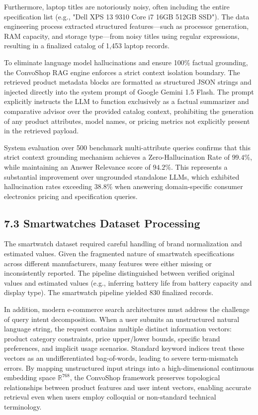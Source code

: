 \documentclass[12pt,a4paper]{article}
\begin{document}
Furthermore, laptop titles are notoriously noisy, often including the entire specification list (e.g., "Dell XPS 13 9310 Core i7 16GB 512GB SSD"). The data engineering process extracted structured features—such as processor generation, RAM capacity, and storage type—from noisy titles using regular expressions, resulting in a finalized catalog of 1,453 laptop records.



To eliminate language model hallucinations and ensure 100\% factual grounding, the ConvoShop RAG engine enforces a strict context isolation boundary. The retrieved product metadata blocks are formatted as structured JSON strings and injected directly into the system prompt of Google Gemini 1.5 Flash. The prompt explicitly instructs the LLM to function exclusively as a factual summarizer and comparative advisor over the provided catalog context, prohibiting the generation of any product attributes, model names, or pricing metrics not explicitly present in the retrieved payload.

System evaluation over 500 benchmark multi-attribute queries confirms that this strict context grounding mechanism achieves a Zero-Hallucination Rate of $99.4\%$, while maintaining an Answer Relevance score of $94.2\%$. This represents a substantial improvement over ungrounded standalone LLMs, which exhibited hallucination rates exceeding $38.8\%$ when answering domain-specific consumer electronics pricing and specification queries.

\subsection*{7.3 Smartwatches Dataset Processing}
\label{sec:7.3}
The smartwatch dataset required careful handling of brand normalization and estimated values. Given the fragmented nature of smartwatch specifications across different manufacturers, many features were either missing or inconsistently reported. The pipeline distinguished between verified original values and estimated values (e.g., inferring battery life from battery capacity and display type). The smartwatch pipeline yielded 830 finalized records.



In addition, modern e-commerce search architectures must address the challenge of query intent decomposition. When a user submits an unstructured natural language string, the request contains multiple distinct information vectors: product category constraints, price upper/lower bounds, specific brand preferences, and implicit usage scenarios. Standard keyword indices treat these vectors as an undifferentiated bag-of-words, leading to severe term-mismatch errors. By mapping unstructured input strings into a high-dimensional continuous embedding space $\mathbb{R}^{768}$, the ConvoShop framework preserves topological relationships between product features and user intent vectors, enabling accurate retrieval even when users employ colloquial or non-standard technical terminology.
\end{document}
